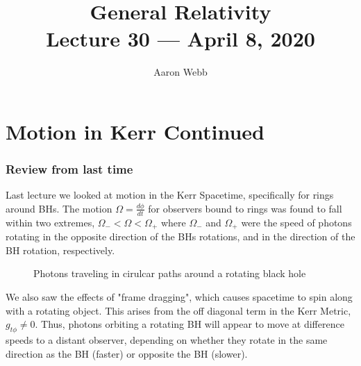 \documentclass[11pt,table]{article}
\title{{\Huge General Relativity}\\{\Large{Lecture 30 --- April 8, 2020}}} %
\author{Aaron Webb}
\begin{document}
\maketitle
\flushbottom
\newpage
\pagestyle{fancynotes}

\part{Motion in Kerr Continued}

\section{Review from last time}

Last lecture we looked at motion in the Kerr Spacetime, specifically for rings around BHs. The motion $\Omega = \frac{d\phi}{dt}$ for observers bound to rings was found to fall within two extremes, $\Omega_- < \Omega < \Omega_+ $ where $\Omega_-$ and $\Omega_+$ were the speed of photons rotating in the opposite direction of the BHs rotations, and in the direction of the BH rotation, respectively.

\begin{figure}[!h]
  \centering
  \caption{Photons traveling in cirulcar paths around a rotating black hole}
  \label{fig:circular_orbit}
\end{figure}

We also saw the effects of "frame dragging", which causes spacetime to spin along with a rotating object. This arises from the off diagonal term in the Kerr Metric, $g_{t\phi} \neq 0$. Thus, photons orbiting a rotating BH will appear to move at difference speeds to a distant observer, depending on whether they rotate in the same direction as the BH (faster) or opposite the BH (slower). \\
\end{document}
